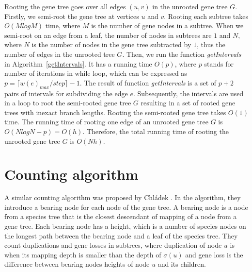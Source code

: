 Rooting the gene tree goes over all edges $(u, v)$ in the unrooted gene tree $G$. Firstly, we semi-root the gene tree at vertices $u$ and $v$. Rooting each subtree takes $O(M log M)$ time, where $M$ is the number of gene nodes in a subtree. When we semi-root on an edge from a leaf, the number of nodes in subtrees are $1$ and $N$, where $N$ is the number of nodes in the gene tree subtracted by $1$, thus the number of edges in the unrooted tree $G$. Then, we run the function \emph{getIntervals} in Algorithm~\ref{getIntervals}. It has a running time $O(p)$, where $p$ stands for number of iterations in while loop, which can be expressed as $p = \lceil w(e)_{max}/step\rceil - 1$. The result of function \emph{getIntervals} is a set of $p+2$ pairs of intervals for subdividing the edge $e$. Subsequently, the intervals are used in a loop to root the semi-rooted gene tree $G$ resulting in a set of rooted gene trees with inexact branch lengths. Rooting the semi-rooted gene tree takes $O(1)$ time. The running time of rooting one edge of an unrooted gene tree $G$ is $O(N log N + p) = O(h)$. Therefore, the total running time of rooting the unrooted gene tree $G$ is $O(Nh)$.


\section{Counting algorithm} \label{counting_algorithm}

A similar counting algorithm was proposed by Chládek \cite{chladek_thesis}. In the algorithm, they introduce a bearing node for each node of the gene tree. A bearing node is a node from a species tree that is the closest descendant of mapping of a node from a gene tree. Each bearing node has a height, which is a number of species nodes on the longest path between the bearing node and a leaf of the species tree. They count duplications and gene losses in subtrees, where duplication of node $u$ is when its mapping depth is smaller than the depth of $\sigma(u)$ and gene loss is the difference between bearing nodes heights of node $u$ and its children.

